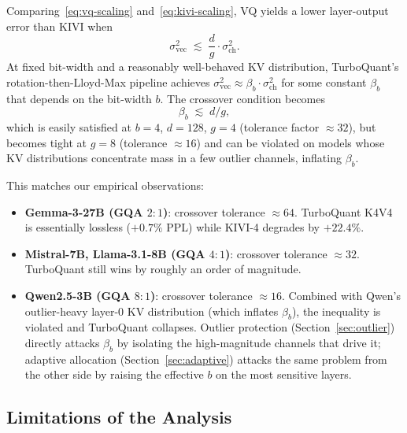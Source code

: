 \documentclass[11pt]{article}
\begin{document}
Comparing~\eqref{eq:vq-scaling} and~\eqref{eq:kivi-scaling}, VQ yields a
lower layer-output error than KIVI when
\begin{equation}
\label{eq:crossover}
\sigma_{\mathrm{vec}}^2 \;\lesssim\; \frac{d}{g} \cdot \sigma_{\mathrm{ch}}^2.
\end{equation}
At fixed bit-width and a reasonably well-behaved KV distribution, TurboQuant's
rotation-then-Lloyd-Max pipeline achieves $\sigma_{\mathrm{vec}}^2 \approx
\beta_b \cdot \sigma_{\mathrm{ch}}^2$ for some constant $\beta_b$ that depends
on the bit-width $b$. The crossover condition becomes
\begin{equation}
\label{eq:crossover-b}
\beta_b \;\lesssim\; d / g,
\end{equation}
which is easily satisfied at $b = 4$, $d = 128$, $g = 4$ (tolerance factor
$\approx 32$), but becomes tight at $g = 8$ (tolerance $\approx 16$) and
can be violated on models whose KV distributions concentrate mass in a few
outlier channels, inflating $\beta_b$.

This matches our empirical observations:

\begin{itemize}
  \item \textbf{Gemma-3-27B (GQA $2{:}1$)}: crossover tolerance $\approx 64$.
  TurboQuant K4V4 is essentially lossless ($+0.7\%$ PPL) while KIVI-4
  degrades by $+22.4\%$.
  \item \textbf{Mistral-7B, Llama-3.1-8B (GQA $4{:}1$)}: crossover tolerance
  $\approx 32$. TurboQuant still wins by roughly an order of magnitude.
  \item \textbf{Qwen2.5-3B (GQA $8{:}1$)}: crossover tolerance $\approx 16$.
  Combined with Qwen's outlier-heavy layer-0 KV distribution (which inflates
  $\beta_b$), the inequality is violated and TurboQuant collapses. Outlier
  protection (Section~\ref{sec:outlier}) directly attacks $\beta_b$ by
  isolating the high-magnitude channels that drive it; adaptive allocation
  (Section~\ref{sec:adaptive}) attacks the same problem from the other side
  by raising the effective $b$ on the most sensitive layers.
\end{itemize}

\subsection{Limitations of the Analysis}
\label{sec:theory-limitations}
\end{document}
